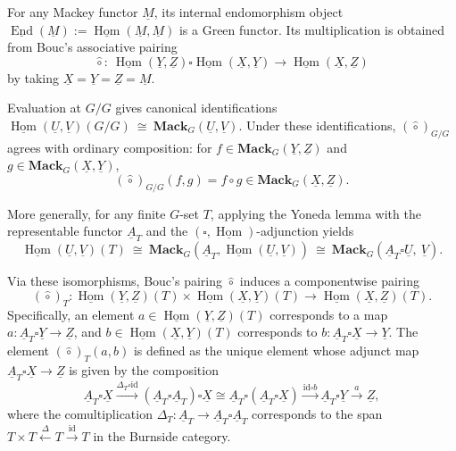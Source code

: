 \documentclass[11pt,oneside]{amsart}
\DeclareMathOperator{\Hom}{Hom}
\DeclareMathOperator{\End}{End}
\numberwithin{equation}{section}
\numberwithin{figure}{section}
\theoremstyle{plain}
\theoremstyle{definition}
\theoremstyle{remark}
\begin{document}
\begin{example}\label{ex:endomorphism-green}
For any Mackey functor $\underline{M}$, its internal endomorphism object
\(
\underline{\End}(\underline{M}) := \underline{\Hom}(\underline{M},\underline{M})
\)
is a Green functor. Its multiplication is obtained from Bouc's associative pairing \cite[Def.~6.1.1, Prop.~6.1.2]{bouc1997}
\[
\hat\circ:\ \underline{\Hom}(\underline Y,\underline Z)\square 
\underline{\Hom}(\underline X,\underline Y)\longrightarrow
\underline{\Hom}(\underline X,\underline Z)
\] by taking $\underline X = \underline Y = \underline Z = \underline M$.

Evaluation at $G/G$ gives  canonical identifications
\(
\underline{\Hom}(\underline U,\underline V)(G/G)\ \cong\ 
\mathbf{Mack}_G(\underline U,\underline V).
\)
Under these identifications, $(\hat\circ)_{G/G}$ agrees with ordinary composition:
for $f\in \mathbf{Mack}_G(\underline Y,\underline Z)$ and 
$g\in \mathbf{Mack}_G(\underline X,\underline Y)$,
\[
(\hat\circ)_{G/G}(f,g)=f\circ g\in \mathbf{Mack}_G(\underline X,\underline Z).
\]

More generally, for any finite $G$-set $T$, applying the Yoneda lemma with the representable functor $\underline{A}_T$ and the $(\square, \underline{\Hom})$-adjunction yields
\[
\underline{\Hom}(\underline U,\underline V)(T)
\ \cong\ \mathbf{Mack}_G(\underline A_T, \underline{\Hom}(\underline U,\underline V))
\ \cong\ \mathbf{Mack}_G(\underline A_T\square \underline U,\ \underline V).
\]

Via these isomorphisms, Bouc's pairing $\hat{\circ}$ induces a componentwise pairing
\[
(\hat{\circ})_T: \underline{\Hom}(\underline{Y}, \underline{Z})(T) \times \underline{\Hom}(\underline{X}, \underline{Y})(T) \longrightarrow \underline{\Hom}(\underline{X}, \underline{Z})(T).
\]
Specifically, an element $a \in \underline{\Hom}(\underline{Y}, \underline{Z})(T)$ corresponds to a map $a : \underline{A}_T \square \underline{Y} \to \underline{Z}$, and $b \in \underline{\Hom}(\underline{X}, \underline{Y})(T)$ corresponds to $b : \underline{A}_T \square \underline{X} \to \underline{Y}$. The element $(\hat{\circ})_T(a,b)$ is defined as the unique element whose adjunct map $\underline{A}_T \square \underline{X} \to \underline{Z}$ is given by the composition
\[
\underline{A}_T \square \underline{X} \xrightarrow{\Delta_T \square \text{id}} (\underline{A}_T \square \underline{A}_T) \square \underline{X} \cong \underline{A}_T \square (\underline{A}_T \square \underline{X}) \xrightarrow{\text{id} \square b} \underline{A}_T \square \underline{Y} \xrightarrow{a} \underline{Z},
\]
where the comultiplication $\Delta_T : \underline{A}_T \to \underline{A}_T \square \underline{A}_T$ corresponds to the span $T \times T \xleftarrow{\Delta} T \xrightarrow{\text{id}} T$ in the Burnside category.
\end{example}
\end{document}
